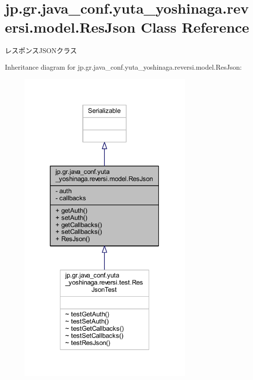 \hypertarget{classjp_1_1gr_1_1java__conf_1_1yuta__yoshinaga_1_1reversi_1_1model_1_1_res_json}{}\section{jp.\+gr.\+java\+\_\+conf.\+yuta\+\_\+yoshinaga.\+reversi.\+model.\+Res\+Json Class Reference}
\label{classjp_1_1gr_1_1java__conf_1_1yuta__yoshinaga_1_1reversi_1_1model_1_1_res_json}


レスポンス\+J\+S\+O\+Nクラス  




Inheritance diagram for jp.\+gr.\+java\+\_\+conf.\+yuta\+\_\+yoshinaga.\+reversi.\+model.\+Res\+Json\+:\nopagebreak
\begin{figure}[H]
\begin{center}
\leavevmode
\includegraphics[width=247pt]{classjp_1_1gr_1_1java__conf_1_1yuta__yoshinaga_1_1reversi_1_1model_1_1_res_json__inherit__graph}
\end{center}
\end{figure}


